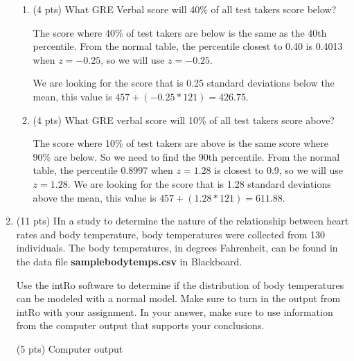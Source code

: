 \documentclass{article}
\begin{document}
\begin{enumerate}
\begin{enumerate}
\item (4 pts) What GRE Verbal score will 40\% of all test takers score below?

The score where 40\% of test takers are below is the same as the 40th percentile. From the normal table, the percentile closest to 0.40 is 0.4013 when $z = -0.25$, so we will use $z = -0.25$.

We are looking for the score that is 0.25 standard deviations below the mean, this value is $457 + (-0.25*121) = 426.75$.

\item (4 pts) What GRE verbal score will 10\% of all test takers score above?

The score where 10\% of test takers are above is the same score where 90\% are below. So we need to find the 90th percentile. From the normal table, the percentile 0.8997 when $z = 1.28$ is closest to 0.9, so we will use $z = 1.28$.  We are looking for the score that is 1.28 standard deviations above the mean, this value is $457 + (1.28*121) = 611.88$.

\end{enumerate}

\newpage

\item (11 pts) IIn a study to determine the nature of the relationship between heart rates and body temperature, body temperatures were collected from 130 individuals. The body temperatures, in degrees Fahrenheit, can be found in the  data file {\bf samplebodytemps.csv} in Blackboard.

Use the intRo software to determine if the distribution of body temperatures can be modeled with a normal model. Make sure to turn in the output from intRo with your assignment. In your answer, make sure to use information from the computer output that supports your conclusions. 

(5 pts) Computer output


\end{enumerate}
\end{document}
